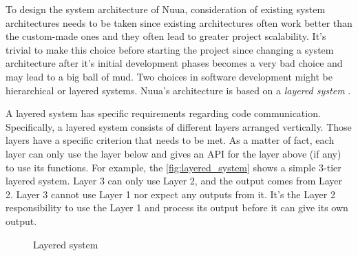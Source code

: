 To design the system architecture of Nuua, consideration of existing system architectures needs to be taken since existing architectures
often work better than the custom-made ones and they often lead to greater project scalability. It's trivial
to make this choice before starting the project since changing a system architecture after it's initial
development phases becomes a very bad choice and may lead to a big ball of mud. Two choices in software development might be hierarchical
or layered systems. Nuua's architecture is based on a \emph{layered system} \autocite{software_architecture}.

A layered system has specific requirements regarding code communication. Specifically, a layered system consists
of different layers arranged vertically. Those layers have a specific criterion that needs to be met. As a matter of fact,
each layer can only use the layer below and gives an API for the layer above (if any) to use its functions. For example,
the \autoref{fig:layered_system} shows a simple 3-tier layered system. Layer 3 can only use Layer 2, and the output comes
from Layer 2. Layer 3 cannot use Layer 1 nor expect any outputs from it. It's the Layer 2 responsibility to use the Layer 1
and process its output before it can give its own output.

\begin{figure}[H]
    \centering

    \caption{Layered system}
    \label{fig:layered_system}
\end{figure}

